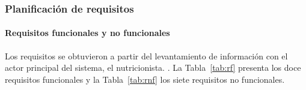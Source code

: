 \subsubsection{Planificación de requisitos}

\paragraph{Requisitos funcionales y no funcionales}

Los requisitos se obtuvieron a partir del levantamiento de información con el
actor principal del sistema, el nutricionista.
.
La Tabla~\ref{tab:rf} presenta los doce requisitos funcionales y la
Tabla~\ref{tab:rnf} los siete requisitos no funcionales.


